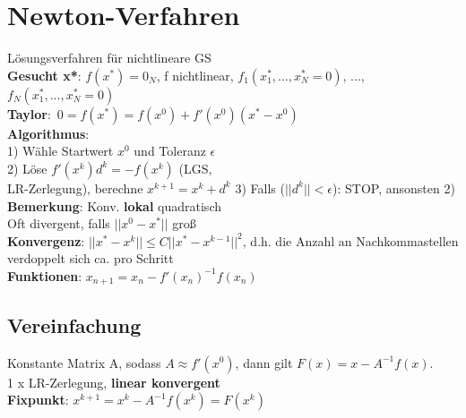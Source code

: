 \section{Newton-Verfahren}
Lösungsverfahren für nichtlineare GS\\
\textbf{Gesucht x*}: $f(x^*) = 0_N$, f nichtlinear,
$f_1(x_1^*, ..., x_N^* = 0)$, ..., $f_N(x_1^*, ..., x_N^* = 0)$\\
\mbox{\textbf{Taylor}: $0 = f(x^*) = f(x^0) + f'(x^0)(x^* - x^0)$}\\
\textbf{Algorithmus}:\\
1) Wähle Startwert $x^0$ und Toleranz $\epsilon$\\
2) Löse $f'(x^k)d^k = -f(x^k)$ (LGS,\\ LR-Zerlegung), berechne $x^{k+1} = x^k + d^k$
3) Falls ($||d^k|| < \epsilon$): STOP, ansonsten 2)\\
\textbf{Bemerkung}: Konv. \textbf{lokal} quadratisch\\
Oft divergent, falls $||x^0 - x^*||$ groß\\
\textbf{Konvergenz}: $||x^* - x^k|| \leq C||x^*-x^{k-1}||^2$, d.h. die Anzahl an Nachkommastellen verdoppelt sich ca. pro Schritt\\
\textbf{Funktionen}: $x_{n+1} = x_n - f'(x_n)^{-1}f(x_n)$
\subsection{Vereinfachung}
Konstante Matrix A, sodass $A \approx f'(x^0)$, dann gilt $F(x) = x - A^{-1}f(x)$.\\
1 x LR-Zerlegung, \textbf{linear konvergent}\\
\textbf{Fixpunkt}: $x^{k+1} = x^k-A^{-1}f(x^k) = F(x^k)$


